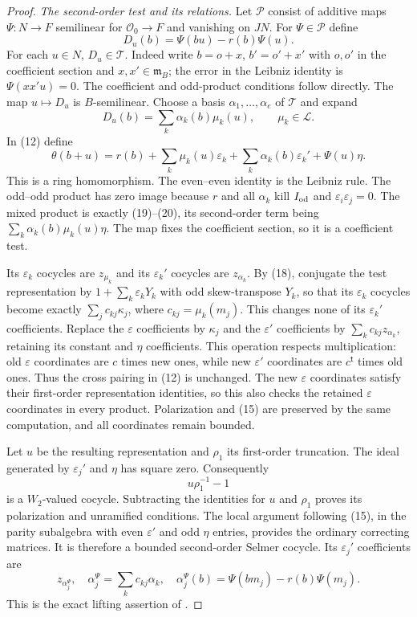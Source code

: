 \begin{proof}
\emph{The second-order test and its relations.}
Let $\mathcal P$ consist of additive maps $\Psi:N\to F$
semilinear for $\mathcal O_0\to F$ and vanishing on $JN$.
For $\Psi\in\mathcal P$ define
\[
                     D_u(b)=\Psi(bu)-r(b)\Psi(u).               \tag{19}
\]
For each $u\in N$, $D_u\in\mathcal T$.
Indeed write $b=o+x$, $b'=o'+x'$ with $o,o'$ in the coefficient
section and $x,x'\in\mathfrak m_B$; the error in the Leibniz
identity is $\Psi(xx'u)=0$.
The coefficient and odd-product conditions follow directly.
The map $u\mapsto D_u$ is $B$-semilinear.
Choose a basis $\alpha_1,\ldots,\alpha_e$ of $\mathcal T$ and
expand
\[
 D_u(b)=\sum_k\alpha_k(b)\mu_k(u),\qquad\mu_k\in\mathcal L.
                                                               \tag{20}
\]
In (12) define
\[
 \theta(b+u)=r(b)+\sum_k\mu_k(u)\varepsilon_k
                  +\sum_k\alpha_k(b)\varepsilon_k'
                  +\Psi(u)\eta.                               \tag{21}
\]
This is a ring homomorphism.
The even--even identity is the Leibniz rule.
The odd--odd product has zero image because $r$ and all
$\alpha_k$ kill $I_{\rm od}$ and
$\varepsilon_i\varepsilon_j=0$.
The mixed product is exactly (19)--(20), its second-order term
being $\sum_k\alpha_k(b)\mu_k(u)\eta$.
The map fixes the coefficient section, so it is a coefficient
test.

Its $\varepsilon_k$ cocycles are $z_{\mu_k}$ and its
$\varepsilon_k'$ cocycles are $z_{\alpha_k}$.
By (18), conjugate the test representation by
$1+\sum_k\varepsilon_kY_k$ with odd skew-transpose $Y_k$, so
that its $\varepsilon_k$ cocycles become exactly
$\sum_jc_{kj}\kappa_j$, where $c_{kj}=\mu_k(m_j)$.
This changes none of its $\varepsilon_k'$ coefficients.
Replace the $\varepsilon$ coefficients by $\kappa_j$ and
the $\varepsilon'$ coefficients by
$\sum_kc_{kj}z_{\alpha_k}$, retaining its constant and
$\eta$ coefficients.
This operation respects multiplication: old $\varepsilon$
coordinates are $c$ times new ones, while new $\varepsilon'$
coordinates are $c^{\mathsf t}$ times old ones.
Thus the cross pairing in (12) is unchanged.
The new $\varepsilon$ coordinates satisfy their first-order
representation identities, so this also checks the retained
$\varepsilon$ coordinates in every product.
Polarization and (15) are preserved by the same computation,
and all coordinates remain bounded.

Let $u$ be the resulting representation and $\rho_1$ its
first-order truncation.  The ideal generated by
$\varepsilon_j'$ and $\eta$ has square zero.
Consequently
\[
                            u\rho_1^{-1}-1                    \tag{22}
\]
is a $W_2$-valued cocycle.
Subtracting the identities for $u$ and $\rho_1$ proves its
polarization and unramified conditions.
The local argument following (15), in the parity subalgebra
with even $\varepsilon'$ and odd $\eta$ entries, provides
the ordinary correcting matrices.
It is therefore a bounded second-order Selmer cocycle.
Its $\varepsilon_j'$ coefficients are
\[
 z_{\alpha_j^\Psi},\quad
 \alpha_j^\Psi=\sum_kc_{kj}\alpha_k,\quad
 \alpha_j^\Psi(b)=\Psi(bm_j)-r(b)\Psi(m_j).                       \tag{23}
\]
This is the exact lifting assertion of .


\end{proof}
